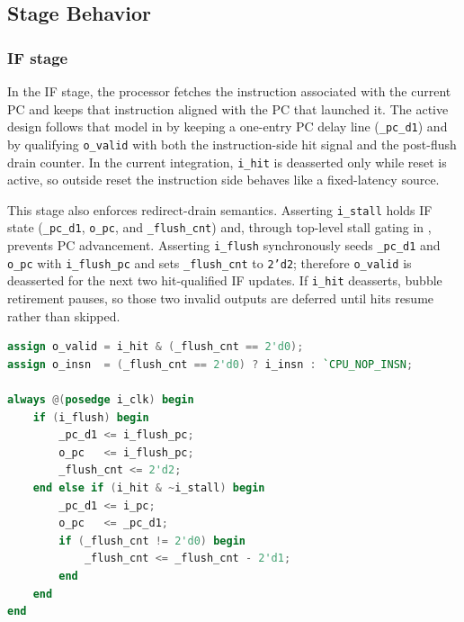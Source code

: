 \documentclass[11pt,a4paper]{article}
\begin{document}
\subsection{Stage Behavior}

\subsubsection{IF stage}

In the IF stage, the processor fetches the instruction associated with the current PC and keeps that instruction aligned with the PC that launched it. The active design follows that model in  by keeping a one-entry PC delay line (\texttt{\_pc\_d1}) and by qualifying \texttt{o\_valid} with both the instruction-side hit signal and the post-flush drain counter. In the current  integration, \texttt{i\_hit} is deasserted only while reset is active, so outside reset the instruction side behaves like a fixed-latency source.

This stage also enforces redirect-drain semantics. Asserting \texttt{i\_stall} holds IF state (\texttt{\_pc\_d1}, \texttt{o\_pc}, and \texttt{\_flush\_cnt}) and, through top-level stall gating in , prevents PC advancement. Asserting \texttt{i\_flush} synchronously seeds \texttt{\_pc\_d1} and \texttt{o\_pc} with \texttt{i\_flush\_pc} and sets \texttt{\_flush\_cnt} to \texttt{2'd2}; therefore \texttt{o\_valid} is deasserted for the next two hit-qualified IF updates. If \texttt{i\_hit} deasserts, bubble retirement pauses, so those two invalid outputs are deferred until hits resume rather than skipped.

\begin{lstlisting}[language=Verilog,caption={Redirect-drain behavior in \texttt{srcs/m\_if\_stage.v}}]
assign o_valid = i_hit & (_flush_cnt == 2'd0);
assign o_insn  = (_flush_cnt == 2'd0) ? i_insn : `CPU_NOP_INSN;

always @(posedge i_clk) begin
    if (i_flush) begin
        _pc_d1 <= i_flush_pc;
        o_pc   <= i_flush_pc;
        _flush_cnt <= 2'd2;
    end else if (i_hit & ~i_stall) begin
        _pc_d1 <= i_pc;
        o_pc   <= _pc_d1;
        if (_flush_cnt != 2'd0) begin
            _flush_cnt <= _flush_cnt - 2'd1;
        end
    end
end
\end{lstlisting}
\end{document}

